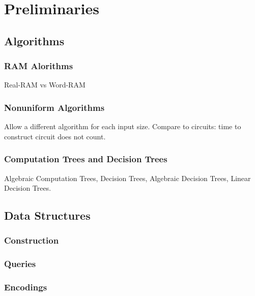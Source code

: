 \part{Preliminaries}\label{sec:preliminaries}

\chapter{Algorithms}

\section{RAM Alorithms}

Real-RAM vs Word-RAM

\section{Nonuniform Algorithms}



Allow a different algorithm for each input size.
Compare to circuits: time to construct circuit does not count.

\section{Computation Trees and Decision Trees}

Algebraic Computation Trees,
Decision Trees,
Algebraic Decision Trees,
Linear Decision Trees.


\chapter{Data Structures}

\section{Construction}

\section{Queries}

\section{Encodings}


